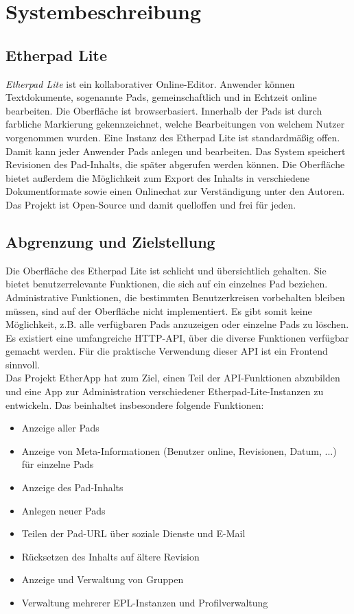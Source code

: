 \section{Systembeschreibung} %
\label{sec:system}

\subsection{Etherpad Lite}
\label{sub:system:etherpad}

\textit{Etherpad Lite} ist ein kollaborativer Online-Editor. Anwender können Textdokumente, sogenannte Pads, gemeinschaftlich und in Echtzeit online bearbeiten. Die Oberfläche ist browserbasiert. Innerhalb der Pads ist durch farbliche Markierung gekennzeichnet, welche Bearbeitungen von welchem Nutzer vorgenommen wurden. Eine Instanz des Etherpad Lite ist standardmäßig offen. Damit kann jeder Anwender Pads anlegen und bearbeiten. Das System speichert Revisionen des Pad-Inhalts, die später abgerufen werden können. Die Oberfläche bietet außerdem die Möglichkeit zum Export des Inhalts in verschiedene Dokumentformate sowie einen Onlinechat zur Verständigung unter den Autoren.\\
Das Projekt ist Open-Source und damit quelloffen und frei für jeden.

\subsection{Abgrenzung und Zielstellung}
Die Oberfläche des Etherpad Lite ist schlicht und übersichtlich gehalten. Sie bietet benutzerrelevante Funktionen, die sich auf ein einzelnes Pad beziehen. Administrative Funktionen, die bestimmten Benutzerkreisen vorbehalten bleiben müssen, sind auf der Oberfläche nicht implementiert. Es gibt somit keine Möglichkeit, z.B. alle verfügbaren Pads anzuzeigen oder einzelne Pads zu löschen.\\
Es existiert eine umfangreiche HTTP-API, über die diverse Funktionen verfügbar gemacht werden. Für die praktische Verwendung dieser API ist ein Frontend sinnvoll.\\
Das Projekt EtherApp hat zum Ziel, einen Teil der API-Funktionen abzubilden und eine App zur Administration verschiedener Etherpad-Lite-Instanzen zu entwickeln. Das beinhaltet insbesondere folgende Funktionen:
\begin{itemize}
	\item Anzeige aller Pads
	\item Anzeige von Meta-Informationen (Benutzer online, Revisionen, Datum, ...) für einzelne Pads
	\item Anzeige des Pad-Inhalts
	\item Anlegen neuer Pads
	\item Teilen der Pad-URL über soziale Dienste und E-Mail
	\item Rücksetzen des Inhalts auf ältere Revision
	\item Anzeige und Verwaltung von Gruppen
	\item Verwaltung mehrerer EPL-Instanzen und Profilverwaltung
\end{itemize}



